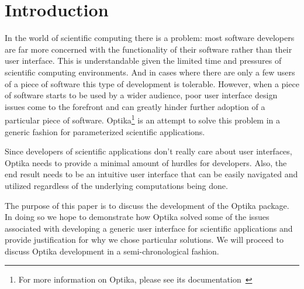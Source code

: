 \section{Introduction}
In the world of scientific computing there is a problem: most software developers are far more concerned
with the functionality of their software rather than their user interface. This is understandable given
the limited time and pressures of scientific computing environments. And in 
cases where there are only a few users of a piece of software this type of development is tolerable. However, when a piece of
software starts to be used by a wider audience, poor user interface design issues come to the forefront and 
can greatly hinder further adoption of a particular piece of software. Optika\footnote{For more information on Optika, please see
its documentation~\cite{OptikaPackage}} is an attempt to solve this
problem in a generic fashion for parameterized scientific applications.

Since developers of scientific applications don't really care about user interfaces, Optika needs
to provide a minimal amount of hurdles for developers. Also, the end result needs to be an intuitive
user interface that can be easily navigated and utilized regardless of the underlying computations being done.

The purpose of this paper is to discuss the development of the Optika package. In doing so we hope to
demonstrate how Optika solved some of the issues associated with developing a generic user interface
for scientific applications and provide justification for why we chose particular solutions. We will
proceed to discuss Optika development in a semi-chronological fashion.

